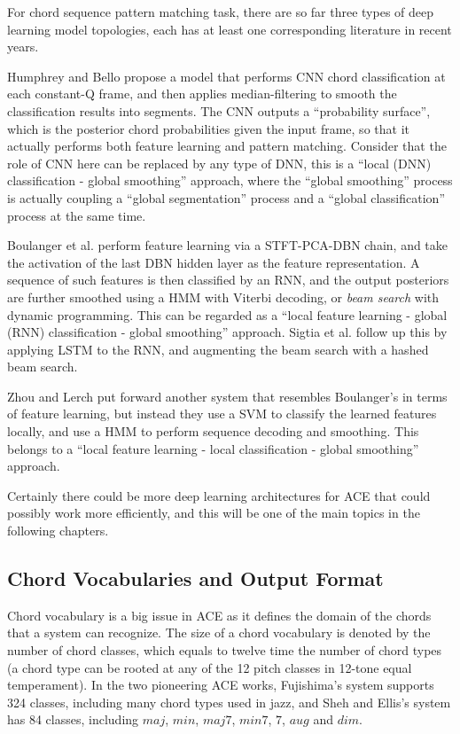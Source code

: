 For chord sequence pattern matching task, there are so far three types of deep learning model topologies, each has at least one corresponding literature in recent years.

Humphrey and Bello \cite{humphrey2012rethinking} propose a model that performs CNN chord classification at each constant-Q frame, and then applies median-filtering to smooth the classification results into segments. The CNN outputs a ``probability surface'', which is the posterior chord probabilities given the input frame, so that it actually performs both feature learning and pattern matching. Consider that the role of CNN here can be replaced by any type of DNN, this is a ``local (DNN) classification - global smoothing'' approach, where the ``global smoothing'' process is actually coupling a ``global segmentation'' process and a ``global classification'' process at the same time.

Boulanger et al. \cite{boulanger2013audio} perform feature learning via a STFT-PCA-DBN chain, and take the activation of the last DBN hidden layer as the feature representation. A sequence of such features is then classified by an RNN, and the output posteriors are further smoothed using a HMM with Viterbi decoding, or {\it beam search} with dynamic programming. This can be regarded as a ``local feature learning - global (RNN) classification - global smoothing'' approach. Sigtia et al. \cite{sigtia2015audio} follow up this by applying LSTM to the RNN, and augmenting the beam search with a hashed beam search.

Zhou and Lerch \cite{zhou2015chord} put forward another system that resembles Boulanger's in terms of feature learning, but instead they use a SVM to classify the learned features locally, and use a HMM to perform sequence decoding and smoothing. This belongs to a ``local feature learning - local classification - global smoothing'' approach.

Certainly there could be more deep learning architectures for ACE that could possibly work more efficiently, and this will be one of the main topics in the following chapters.

\subsection{Chord Vocabularies and Output Format} \label{sec:2-vocab}
Chord vocabulary is a big issue in ACE as it defines the domain of the chords that a system can recognize. The size of a chord vocabulary is denoted by the number of chord classes, which equals to twelve time the number of chord types (a chord type can be rooted at any of the 12 pitch classes in 12-tone equal temperament). In the two pioneering ACE works, Fujishima's system \cite{fujishima1999realtime} supports 324 classes, including many chord types used in jazz, and Sheh and Ellis's system \cite{sheh2003chord} has 84 classes, including $maj$, $min$, $maj7$, $min7$, $7$, $aug$ and $dim$.

